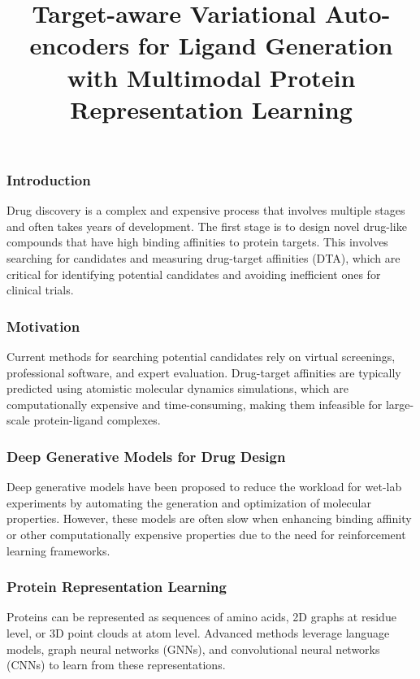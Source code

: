 \documentclass[11pt,xcolor={dvipsnames},hyperref={pdftex,pdfpagemode=UseNone,hidelinks,pdfdisplaydoctitle=true},usepdftitle=false]{beamer}
\begin{document}
\title{Target-aware Variational Auto-encoders for Ligand Generation with Multimodal Protein Representation Learning}
%
\frame{\titlepage}

\begin{frame}
    \frametitle{Introduction}
    Drug discovery is a complex and expensive process that involves multiple stages and often takes years of development. The first stage is to design novel drug-like compounds that have high binding affinities to protein targets. This involves searching for candidates and measuring drug-target affinities (DTA), which are critical for identifying potential candidates and avoiding inefficient ones for clinical trials.
    
    \end{frame}
    
    \begin{frame}
    \frametitle{Motivation}
    Current methods for searching potential candidates rely on virtual screenings, professional software, and expert evaluation. Drug-target affinities are typically predicted using atomistic molecular dynamics simulations, which are computationally expensive and time-consuming, making them infeasible for large-scale protein-ligand complexes.
    
    \end{frame}
    
    \begin{frame}
    \frametitle{Deep Generative Models for Drug Design}
    Deep generative models have been proposed to reduce the workload for wet-lab experiments by automating the generation and optimization of molecular properties. However, these models are often slow when enhancing binding affinity or other computationally expensive properties due to the need for reinforcement learning frameworks.
    
    \end{frame}
    
    \begin{frame}
    \frametitle{Protein Representation Learning}
    Proteins can be represented as sequences of amino acids, 2D graphs at residue level, or 3D point clouds at atom level. Advanced methods leverage language models, graph neural networks (GNNs), and convolutional neural networks (CNNs) to learn from these representations.
    
    \end{frame}
    
\end{document}

